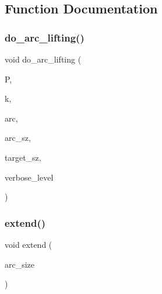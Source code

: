 \subsection{Function Documentation}
\mbox{\label{arcs__orderly_8_c_a7367bc544c290322bdbd4545388a27a8}} 
\subsubsection{\texorpdfstring{do\+\_\+arc\+\_\+lifting()}{do\_arc\_lifting()}}
{\footnotesize\ttfamily void do\+\_\+arc\+\_\+lifting (\begin{DoxyParamCaption}\item[{\mbox{\hyperlink{classprojective__space}{projective\+\_\+space}} $\ast$}]{P,  }\item[{\mbox{\hyperlink{galois_8h_a09fddde158a3a20bd2dcadb609de11dc}{I\+NT}}}]{k,  }\item[{\mbox{\hyperlink{galois_8h_a09fddde158a3a20bd2dcadb609de11dc}{I\+NT}} $\ast$}]{arc,  }\item[{\mbox{\hyperlink{galois_8h_a09fddde158a3a20bd2dcadb609de11dc}{I\+NT}}}]{arc\+\_\+sz,  }\item[{\mbox{\hyperlink{galois_8h_a09fddde158a3a20bd2dcadb609de11dc}{I\+NT}}}]{target\+\_\+sz,  }\item[{\mbox{\hyperlink{galois_8h_a09fddde158a3a20bd2dcadb609de11dc}{I\+NT}}}]{verbose\+\_\+level }\end{DoxyParamCaption})}

\mbox{\label{arcs__orderly_8_c_addc6404f0f11185218b39a9df0e7a293}} 
\subsubsection{\texorpdfstring{extend()}{extend()}}
{\footnotesize\ttfamily void extend (\begin{DoxyParamCaption}\item[{\mbox{\hyperlink{galois_8h_a09fddde158a3a20bd2dcadb609de11dc}{I\+NT}}}]{arc\+\_\+size }\end{DoxyParamCaption})}

